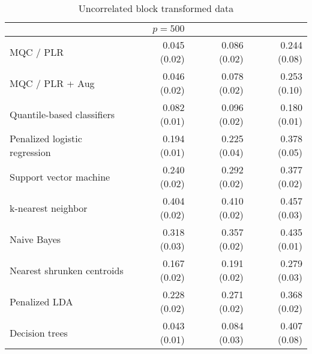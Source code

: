 \begin{table}[p]
\begin{adjustbox}{max size={\textwidth}{10cm}}
\begin{tabular}{l@{\extracolsep{15mm}}rrr}
      \hline
      & $p = 500$ \\
      \hline

      MQC / PLR & 0.045 (0.02) & 0.086 (0.02) & 0.244 (0.08) \\ 
      MQC / PLR + Aug & 0.046 (0.02) & 0.078 (0.02) & 0.253 (0.10) \\ 
      Quantile-based classifiers & 0.082 (0.01) & 0.096 (0.02) & 0.180 (0.01) \\ 
      Penalized logistic regression & 0.194 (0.01) & 0.225 (0.04) & 0.378 (0.05) \\ 
      Support vector machine & 0.240 (0.02) & 0.292 (0.02) & 0.377 (0.02) \\ 
      k-nearest neighbor & 0.404 (0.02) & 0.410 (0.02) & 0.457 (0.03) \\ 
      Naive Bayes & 0.318 (0.03) & 0.357 (0.02) & 0.435 (0.01) \\ 
      Nearest shrunken centroids & 0.167 (0.02) & 0.191 (0.02) & 0.279 (0.03) \\ 
      Penalized LDA & 0.228 (0.02) & 0.271 (0.02) & 0.368 (0.02) \\ 
      Decision trees & 0.043 (0.01) & 0.084 (0.03) & 0.407 (0.08) \\ 
      \hline
      
    \end{tabular}
  \end{adjustbox}
  \caption{Uncorrelated block transformed data}
\end{table}


